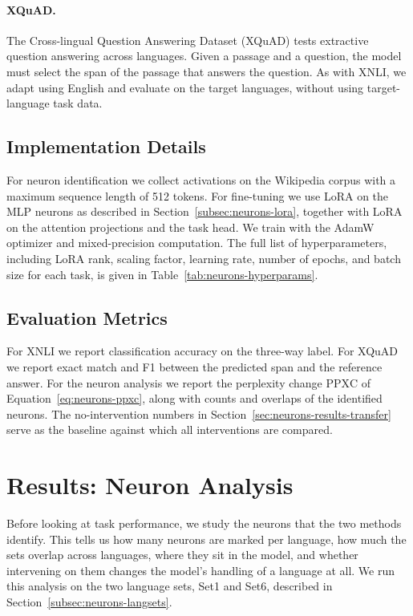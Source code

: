 \paragraph{XQuAD.}
The Cross-lingual Question Answering Dataset (XQuAD) \citep{artetxe2020cross} tests
extractive question answering across languages. Given a passage and a question, the
model must select the span of the passage that answers the question. As with XNLI,
we adapt using English and evaluate on the target languages, without using
target-language task data.

\subsection{Implementation Details}
\label{subsec:neurons-impl}

For neuron identification we collect activations on the Wikipedia corpus
\citep{wikidump} with a maximum sequence length of 512 tokens. For fine-tuning we
use LoRA on the MLP neurons as described in
Section~\ref{subsec:neurons-lora}, together with LoRA on the attention projections
and the task head. We train with the AdamW optimizer and mixed-precision
computation. The full list of hyperparameters, including LoRA rank, scaling factor,
learning rate, number of epochs, and batch size for each task, is given in
Table~\ref{tab:neurons-hyperparams}.

\subsection{Evaluation Metrics}
\label{subsec:neurons-metrics}

For XNLI we report classification accuracy on the three-way label. For XQuAD we
report exact match and F1 between the predicted span and the reference answer. For
the neuron analysis we report the perplexity change $\mathrm{PPXC}$ of
Equation~\ref{eq:neurons-ppxc}, along with counts and overlaps of the identified
neurons. The no-intervention numbers in
Section~\ref{sec:neurons-results-transfer} serve as the baseline against which all
interventions are compared.

\section{Results: Neuron Analysis}
\label{sec:neurons-results-analysis}

Before looking at task performance, we study the neurons that the two methods
identify. This tells us how many neurons are marked per language, how much the
sets overlap across languages, where they sit in the model, and whether
intervening on them changes the model's handling of a language at all. We run this
analysis on the two language sets, Set1 and Set6, described in
Section~\ref{subsec:neurons-langsets}.

